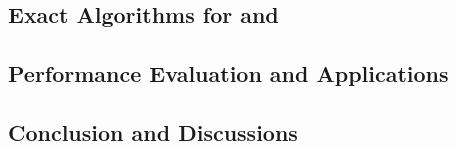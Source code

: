 \subsection{Exact Algorithms for \opglr and \opgmc}\label{sec:opgext-algorithm}


\subsection{Performance Evaluation and Applications}\label{sec:opgext-application}


\subsection{Conclusion and Discussions}\label{sec:opgext-conclusion}

